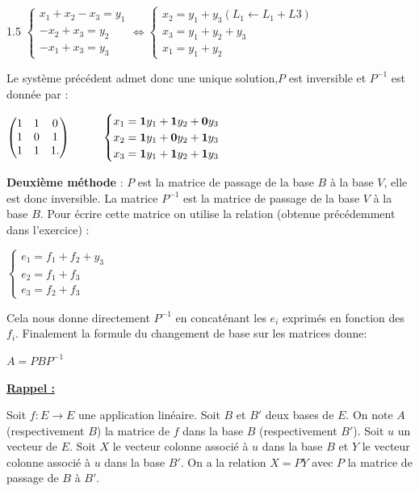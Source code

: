 \documentclass[12pt]{article}
\begin{document}
\begin{spacing}{1.5}
 $
 \begin{cases}
 x_1+x_2-x_3=y_1\\
 -x_2+x_3=y_2\\
 -x_1+x_3=y_3
 \end{cases}\Leftrightarrow \begin{cases}
 x_2=y_1+y_3 (L_1\longleftarrow L_1+L3)\\
 x_3=y_1+y_2+y_3\\
 x_1=y_1+y_2
 \end{cases}
 $
 
  Le système précédent admet donc une unique solution,$P$ est inversible et $P^{-1}$ est donnée par :
  
  $
  \begin{pmatrix}
 1 & 1 & 0 \\ 
 1 & 0 & 1 \\ 
 1 & 1 & 1.
 \end{pmatrix} \hspace*{1cm}\begin{cases}
 x_1=\textbf{1} y_1+\textbf{1}y_2+\textbf{0}y_3\\
 x_2=\textbf{1} y_1+\textbf{0}y_2+\textbf{1}y_3\\
 x_3=\textbf{1} y_1+\textbf{1}y_2+\textbf{1}y_3
 \end{cases}
 $
 
  \textbf{Deuxième méthode} : $P$ est la matrice de passage de la base $B$ à la base $V$, elle est
 donc inversible. La matrice $P^{-1}$ est la matrice de passage de la base $V$ à la base $B$. Pour
 écrire cette matrice on utilise la relation (obtenue précédemment dans l'exercice) :
 
 $
 \begin{cases}
 e_1=f_1+f_2+y_3\\
 e_2=f_1+f_3\\
 e_3=f_2+f_3
\end{cases}
 $
 
 Cela nous donne directement $P^{-1}$ en concaténant les $e_i$ exprimés en fonction des $f_i$.
Finalement la formule du changement de base sur les matrices donne:

$
A=PBP^{-1}
$

\underline{\textbf{Rappel :}}

 Soit $f :E\rightarrow E$ une application linéaire. Soit $B$ et $B'$ deux bases de $E$. On note $A$
 (respectivement $B$) la matrice de $f$ dans la base $B$ (respectivement $B'$). Soit $u$ un vecteur
 de $E$. Soit $X$ le vecteur colonne associé à $u$ dans la base $B$  et $Y$ le vecteur colonne associé
 à $u$ dans la base $B'$. On a la relation $X=PY$ avec $P$ la matrice de passage de $B$ à $B'$.
 

\end{spacing}
\end{document}
